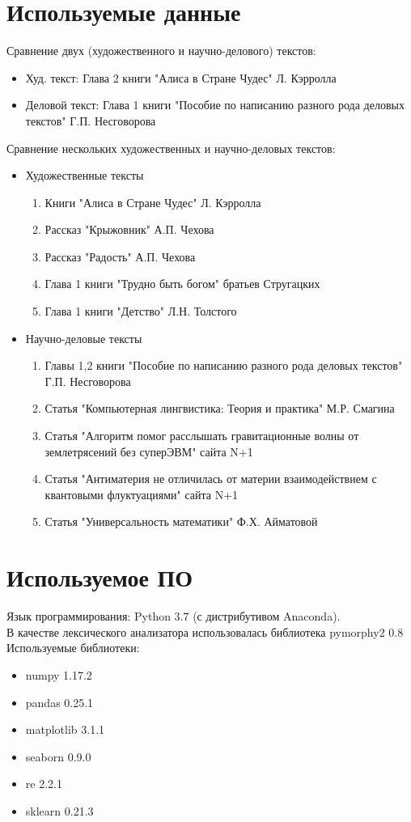 \documentclass[a4paper,12pt]{article}
\begin{document}
\section{Используемые данные}
Сравнение двух (художественного и научно-делового) текстов:
\begin{itemize}
\item Худ. текст: Глава 2 книги "Алиса в Стране Чудес" Л. Кэрролла
\item Деловой текст: Глава 1 книги "Пособие по написанию разного рода деловых текстов" Г.П. Несговорова
\end{itemize}

Сравнение нескольких художественных и научно-деловых текстов:
\begin{itemize}
\item Художественные тексты
\begin{enumerate}
\item Книги "Алиса в Стране Чудес" Л. Кэрролла
\item Рассказ "Крыжовник" А.П. Чехова
\item Рассказ "Радость" А.П. Чехова
\item Глава 1 книги "Трудно быть богом" братьев Стругацких
\item Глава 1 книги "Детство" Л.Н. Толстого
\end{enumerate}
\item Научно-деловые тексты
\begin{enumerate}
\item Главы 1,2 книги "Пособие по написанию разного рода деловых текстов" Г.П. Несговорова
\item Статья "Компьютерная лингвистика: Теория и практика" М.Р. Смагина
\item Статья "Алгоритм помог расслышать гравитационные волны от землетрясений без суперЭВМ" сайта N+1
\item Статья "Антиматерия не отличилась от материи взаимодействием с квантовыми флуктуациями" сайта N+1
\item Статья "Универсальность математики" Ф.Х. Айматовой
\end{enumerate}
\end{itemize}

\section{Используемое ПО}
Язык программирования: Python 3.7 (с дистрибутивом Anaconda).\\
В качестве лексического анализатора использовалась библиотека pymorphy2 0.8\\
Используемые библиотеки:
\begin{itemize}
\item numpy 1.17.2
\item pandas 0.25.1
\item matplotlib 3.1.1
\item seaborn 0.9.0
\item re 2.2.1
\item sklearn 0.21.3
\end{itemize}
\end{document}
